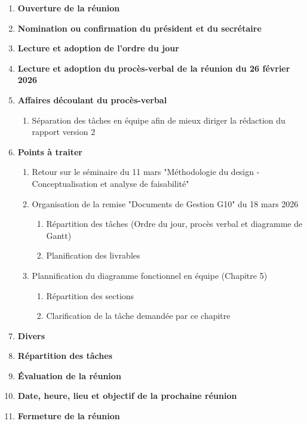\documentclass[12pt]{ULojpv}
\begin{document}
\entete
\begin{enumerate}
   \item \textbf{Ouverture de la réunion}
   \item \textbf{Nomination ou confirmation du président et du secrétaire}
   \item \textbf{Lecture et adoption de l'ordre du jour}
   \item \textbf{Lecture et adoption du procès-verbal de la réunion du 26 février 2026}
   \item \textbf{Affaires découlant du procès-verbal}
      \begin{enumerate}
         \item Séparation des tâches en équipe afin de mieux diriger la rédaction du rapport version 2
      \end{enumerate}
   \item \textbf{Points à traiter}
      \begin{enumerate}
         \item Retour sur le séminaire du 11 mars "Méthodologie du design - Conceptualisation et analyse de faisabilité"
         \item Organisation de la remise "Documents de Gestion G10" du 18 mars 2026
          \begin{enumerate}
               \item Répartition des tâches (Ordre du jour, procès verbal et diagramme de Gantt)
               \item Planification des livrables
            \end{enumerate}
        \item Plannification du diagramme fonctionnel en équipe (Chapitre 5)
        \begin{enumerate}
               \item Répartition des sections
               \item Clarification de la tâche demandée par ce chapitre
            \end{enumerate}
        
      \end{enumerate}
   \item \textbf{Divers}
   \item \textbf{Répartition des tâches}
   \item \textbf{Évaluation de la réunion}
   \item \textbf{Date, heure, lieu et objectif de la prochaine réunion}
   \item \textbf{Fermeture de la réunion}
\end{enumerate}
\end{document}
